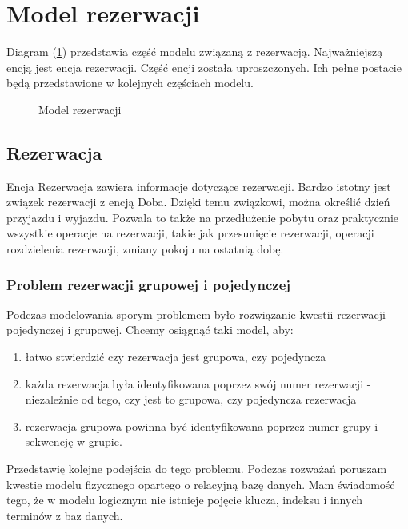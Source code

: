 \documentclass[a4paper,onecolumn,oneside,11pt,wide,floatssmall]{mwrep}
\theoremstyle{definition}
\theoremstyle{plain}%
\theoremstyle{remark}
\begin{document}
\section{Model rezerwacji}
Diagram (\ref{fig:db-logical-model-reservation}) przedstawia część modelu związaną z rezerwacją. Najważniejszą encją jest encja rezerwacji. Część encji została uproszczonych. Ich pełne postacie będą przedstawione w kolejnych częściach modelu.

\begin{figure}[H]
  \begin{center}
  \end{center}
  \caption{Model rezerwacji}
  \label{fig:db-logical-model-reservation}
\end{figure}

\subsection{Rezerwacja}
Encja Rezerwacja zawiera informacje dotyczące rezerwacji. Bardzo istotny jest związek rezerwacji z encją Doba. Dzięki temu związkowi, można określić dzień przyjazdu i wyjazdu. Pozwala to także na przedłużenie pobytu oraz praktycznie wszystkie operacje na rezerwacji, takie jak przesunięcie rezerwacji, operacji rozdzielenia rezerwacji, zmiany pokoju na ostatnią dobę. 

\subsubsection{Problem rezerwacji grupowej i pojedynczej}

Podczas modelowania sporym problemem było rozwiązanie kwestii rezerwacji pojedynczej i grupowej. Chcemy osiągnąć taki model, aby:

\begin{enumerate}
  \item łatwo stwierdzić czy rezerwacja jest grupowa, czy pojedyncza
  \item każda rezerwacja była identyfikowana poprzez swój numer rezerwacji - niezależnie od tego, czy jest to grupowa, czy pojedyncza rezerwacja
  \item rezerwacja grupowa powinna być identyfikowana poprzez numer grupy i sekwencję w grupie.
\end{enumerate}

Przedstawię kolejne podejścia do tego problemu. Podczas rozważań poruszam kwestie modelu fizycznego opartego o relacyjną bazę danych. Mam świadomość tego, że w modelu logicznym nie istnieje pojęcie klucza, indeksu i innych terminów z baz danych. 
\end{document}
